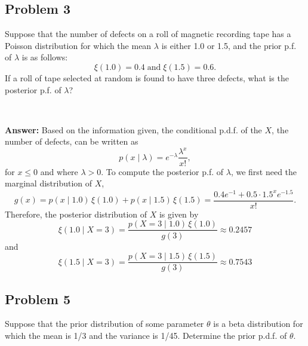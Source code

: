 \documentclass{article}
\begin{document}
\bigskip

\subsection*{Problem 3}
Suppose that the number of defects on a roll of magnetic recording tape has a Poisson distribution for which the mean $\lambda$ is either 1.0 or 1.5, and the prior p.f. of $\lambda$ is as follows:
\begin{equation*}
\xi(1.0) = 0.4 \; \text{and} \; \xi(1.5) = 0.6.
\end{equation*}
If a roll of tape selected at random is found to have three defects, what is the posterior p.f. of $\lambda$?

\

\textbf{Answer:} Based on the information given, the conditional p.d.f. of the $X$, the number of defects, can be written as
\begin{equation*}
p(x \mid \lambda) = e^{-\lambda}\frac{\lambda^x}{x!},
\end{equation*}
for $x \le 0$ and where $\lambda > 0$.
To compute the posterior p.f. of $\lambda$, we first need the marginal distribution of $X$,
\begin{equation*}
g(x) = p(x \mid 1.0) \, \xi(1.0) + p(x \mid 1.5) \, \xi(1.5) = \frac{0.4e^{-1} + 0.5 \cdot 1.5^x e^{-1.5}}{x!}.
\end{equation*}
Therefore, the posterior distribution of $X$ is given by
\begin{equation*}
\xi(1.0 \mid X = 3) = \frac{p(X = 3 \mid 1.0) \, \xi(1.0)}{g(3)} \approx 0.2457
\end{equation*}
and
\begin{equation*}
\xi(1.5 \mid X = 3) = \frac{p(X = 3 \mid 1.5) \, \xi(1.5)}{g(3)} \approx 0.7543
\end{equation*}

\bigskip

\subsection*{Problem 5}
Suppose that the prior distribution of some parameter $\theta$ is a beta distribution for which the mean is 1/3 and the variance is 1/45. Determine the prior p.d.f. of $\theta$.

\
\end{document}
